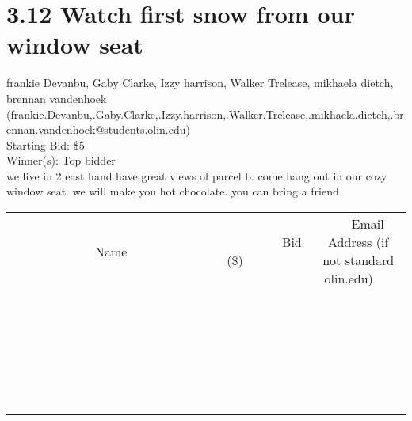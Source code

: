 \documentclass[11pt]{article}
\begin{document}
\section*{3.12 Watch first snow from our window seat}
frankie Devanbu, Gaby Clarke, Izzy harrison, Walker Trelease, mikhaela dietch, brennan vandenhoek (frankie.Devanbu,.Gaby.Clarke,.Izzy.harrison,.Walker.Trelease,.mikhaela.dietch,.brennan.vandenhoek@students.olin.edu) \\
Starting Bid: \$5 \\
Winner(s): 
Top bidder \\
we live in 2 east hand have great views of parcel b. come hang out in our cozy window seat. we will make you hot chocolate. you can bring a friend \\[6ex]
\begin{tabular}{c c c}
~~~~~~~~~~~~~Name~~~~~~~~~~~~~ & ~~~~~~~~~Bid (\$)~~~~~~~~~ & ~~~Email Address (if not standard olin.edu)~~~ \\
 & & \\
\hline
 & & \\
\hline
 & & \\
\hline
 & & \\
\hline
 & & \\
\hline
 & & \\
\hline
 & & \\
\hline
 & & \\
\hline
 & & \\
\hline
 & & \\
\hline
 & & \\
\hline
 & & \\
\hline
 & & \\
\hline
 & & \\
\hline
 & & \\
\hline
 & & \\
\hline
 & & \\
\hline
 & & \\
\hline
 & & \\
\hline
 & & \\
\hline
 & & \\
\hline
 & & \\
\hline
 & & \\
\hline
 & & \\
\hline
 & & \\
\hline
 & & \\
\hline
\end{tabular}
\clearpage
\end{document}
